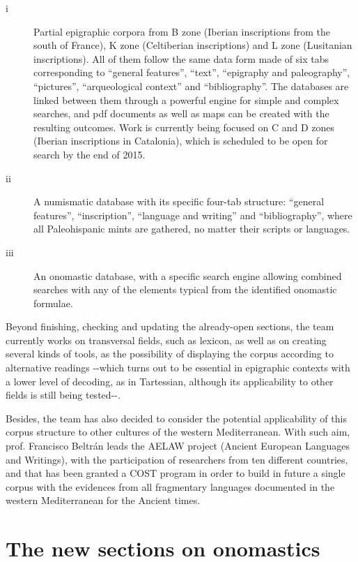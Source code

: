 \documentclass[amsthm,ebook]{saparticle}
\begin{document}
\begin{description}
\item[i] Partial epigraphic corpora from B zone (Iberian inscriptions from the south of France), K zone (Celtiberian
inscriptions) and L zone (Lusitanian inscriptions). All of them follow the same data form made of six tabs
corresponding to ``general features'', ``text'',
``epigraphy and paleography'', ``pictures'',
``arqueological context'' and ``bibliography''. The databases are
linked between them through a powerful engine for simple and complex searches, and pdf documents as well as maps can be
created with the resulting outcomes. Work is currently being focused on C and D zones (Iberian inscriptions in
Catalonia), which is scheduled to be open for search by the end of 2015.

\item[ii] A numismatic database with its specific four-tab structure: ``general features'',
``inscription'', ``language and writing'' and
``bibliography'', where all Paleohispanic mints are gathered, no matter their scripts or
languages.

\item[iii] An onomastic database, with a specific search engine allowing combined searches with any of the elements typical
from the identified onomastic formulae. 

\end{description}

Beyond finishing, checking and updating the already-open sections, the team currently works on transversal fields, such
as lexicon, as well as on creating several kinds of tools, as the possibility of displaying the corpus according to
alternative readings -{}-which turns out to be essential in epigraphic contexts with a lower level of decoding, as in
Tartessian, although its applicability to other fields is still being tested-{}-. 

Besides, the team has also decided to consider the potential applicability of this corpus structure to other cultures of
the western Mediterranean. With such aim, prof. Francisco Beltrán leads the AELAW project (Ancient European Languages
and Writings), with the participation of researchers from ten different countries, and that has been granted a COST
program in order to build in future a single corpus with the evidences from all fragmentary languages documented in the
western Mediterranean for the Ancient times.

\section{The new sections on onomastics}
\end{document}
